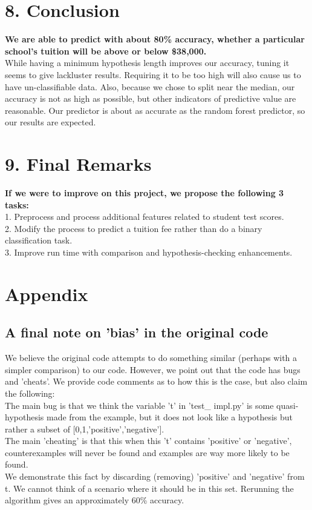 \documentclass[12pt, a4, epsf] {article}
\theoremstyle{plain}
\theoremstyle{definition}
\begin{document}
\section*{8. Conclusion}
\textbf{We are able to predict with about 80\% accuracy, whether a particular school's tuition will be above or below \$38,000. }\\
While having a minimum hypothesis length improves our accuracy, tuning it seems to give lackluster results. Requiring it to be too high will also cause us to have un-classifiable data. Also, because we chose to split near the median, our accuracy is not as high as possible, but other indicators of predictive value are reasonable. Our predictor is about as accurate as the random forest predictor, so our results are expected.\\
\section*{9. Final Remarks}
\textbf{If we were to improve on this project, we propose the following 3 tasks:}\\
1. Preprocess and process additional features related to student test scores.\\
2. Modify the process to predict a tuition fee rather than do a binary classification task.\\
3. Improve run time with comparison and hypothesis-checking enhancements.

\section*{Appendix}
\subsection*{A final note on 'bias' in the original code}
We believe the original code attempts to do something similar (perhaps with a simpler comparison) to our code. However, we point out that the code has bugs and 'cheats'. We provide code comments as to how this is the case, but also claim the following:\\
The main bug is that we think the variable 't' in 'test\_ impl.py' is some quasi-hypothesis made from the example, but it does not look like a hypothesis but rather a subset of [0,1,'positive','negative'].\\
The main 'cheating' is that this when this 't' contains 'positive' or 'negative', counterexamples will never be found and examples are way more likely to be found.\\
We demonstrate this fact by discarding (removing) 'positive' and 'negative' from t. We cannot think of a scenario where it should be in this set. Rerunning the algorithm gives an approximately 60\% accuracy.
\end{document}
